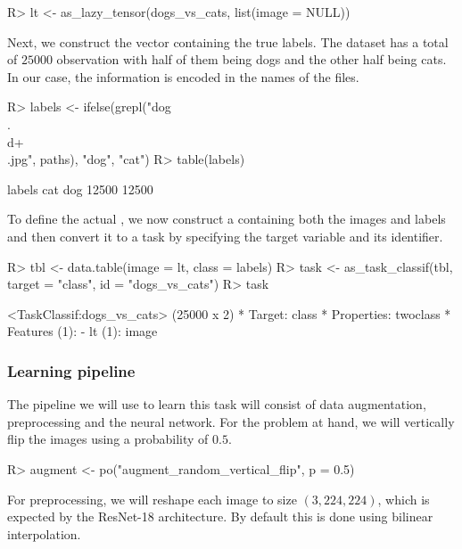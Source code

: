 \documentclass[article]{jss}
\theoremstyle{definition}
\begin{document}
\begin{CodeInput}
R> lt <- as_lazy_tensor(dogs_vs_cats, list(image = NULL))
\end{CodeInput}

Next, we construct the vector containing the true labels.
The dataset has a total of $25000$ observation with half of them being dogs and the other half being cats.
In our case, the information is encoded in the names of the files.

\begin{CodeInput}
R> labels <- ifelse(grepl("dog\\.\\d+\\.jpg", paths), "dog", "cat")
R> table(labels)
\end{CodeInput}
\begin{CodeOutput}
labels
  cat   dog
12500 12500
\end{CodeOutput}

To define the actual , we now construct a  \citep{ref-datatable2024} containing both the images and labels and then convert it to a task by specifying the target variable and its identifier.

\begin{CodeInput}
R> tbl <- data.table(image = lt, class = labels)
R> task <- as_task_classif(tbl, target = "class", id = "dogs_vs_cats")
R> task
\end{CodeInput}
\begin{CodeOutput}
<TaskClassif:dogs_vs_cats> (25000 x 2)
* Target: class
* Properties: twoclass
* Features (1):
  - lt (1): image
\end{CodeOutput}

\subsubsection{Learning pipeline}

The pipeline we will use to learn this task will consist of data augmentation, preprocessing and the neural network.
For the problem at hand, we will vertically flip the images using a probability of $0.5$.

\begin{CodeInput}
R> augment <- po("augment_random_vertical_flip", p = 0.5)
\end{CodeInput}

For preprocessing, we will reshape each image to size $(3, 224, 224)$, which is expected by the ResNet-18 architecture.
By default this is done using bilinear interpolation.
\end{document}
